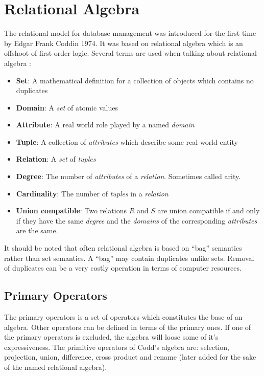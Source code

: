 \section{Relational Algebra}
\label{sect:theory:relAlg}

The relational model for database management was introduced for the first time by Edgar Frank Coddin
1974\cite{TDT4225}. It was based on relational algebra which is an offshoot of first-order logic. Several terms
are used when talking about relational algebra \cite{gordonRussel}\cite{newYorkDB}\cite{sudarshan}:
\begin{itemize}
\item \textbf{Set}: A mathematical definition for a collection of objects which contains no duplicates
\item \textbf{Domain}: A \textit{set} of atomic values
\item \textbf{Attribute}: A real world role played by a named \textit{domain}
\item \textbf{Tuple}: A collection of \textit{attributes} which describe some real world entity
\item \textbf{Relation}: A \textit{set} of \textit{tuples}
\item \textbf{Degree}: The number of \textit{attributes} of a \textit{relation}. Sometimes called arity.
\item \textbf{Cardinality}: The number of \textit{tuples} in a \textit{relation}
\item \textbf{Union compatible}: Two relations $R$ and $S$ are union compatible if and only if they have the same
	\textit{degree} and the \textit{domains} of the corresponding \textit{attributes} are the same.
\end{itemize}

It should be noted that often relational algebra is based on ``bag'' semantics rather than set semantics. A
``bag'' may contain duplicates unlike sets. Removal of duplicates can be a very costly operation in terms of
computer resources.

\subsection{Primary Operators}
\label{sect:theory:relAlg:primOper}
The primary operators is a set of operators which constitutes the base of an algebra. Other operators can be
defined in terms of the primary ones. If one of the primary operators is excluded, the algebra will loose some of
it's expressiveness. The primitive operators of Codd's algebra are: selection, projection, union, difference,
cross product and rename (later added for the sake of the named relational algebra).

